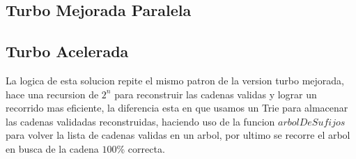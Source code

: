 \documentclass[conference]{IEEEtran}
\begin{document}
\subsection{\textbf{Turbo Mejorada Paralela}}

\subsection{\textbf{Turbo Acelerada}}

La logica de esta solucion repite el mismo patron de la version turbo mejorada, hace una recursion de $2^n$ para reconstruir las cadenas validas y lograr un recorrido mas eficiente, la diferencia esta en que usamos un Trie para almacenar las cadenas validadas reconstruidas, haciendo uso de la funcion $arbolDeSufijos$ para volver la lista de cadenas validas en un arbol, por ultimo se recorre el arbol en busca de la cadena $100$\% correcta.
\end{document}
